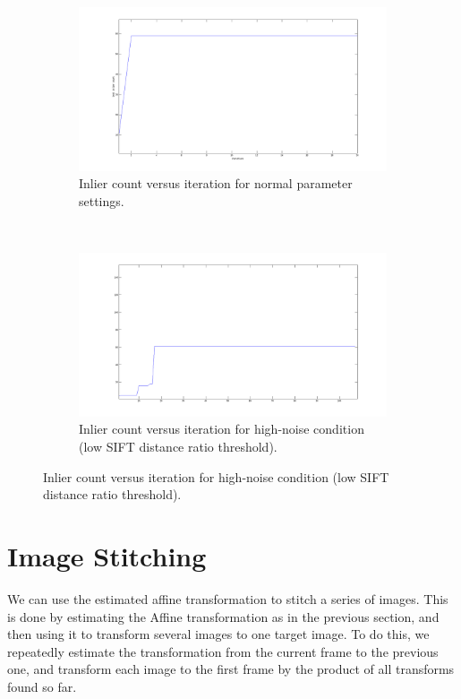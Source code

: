 \documentclass[a4paper,10pt]{article}
\begin{document}
\begin{figure}
\label{fig:inliercount}
        \centering
        \begin{subfigure}[b]{1\textwidth}
                \centering
                \includegraphics[width=\textwidth]{img/inliercount}
                \caption{Inlier count versus iteration for normal parameter settings.}
        \end{subfigure}
        ~
        \begin{subfigure}[b]{1\textwidth}
                \centering
                \includegraphics[width=\textwidth]{img/inliercount_11}
                \caption{Inlier count versus iteration for high-noise condition (low SIFT distance ratio threshold).}
        \end{subfigure}
        
\end{figure}

\section{Image Stitching}
We can use the estimated affine transformation to stitch a series of images.
This is done by estimating the Affine transformation as in the previous section, and then using it to transform several images to one target image.
To do this, we repeatedly estimate the transformation from the current frame to the previous one, and transform each image to the first frame by the product of all transforms found so far.
\end{document}
